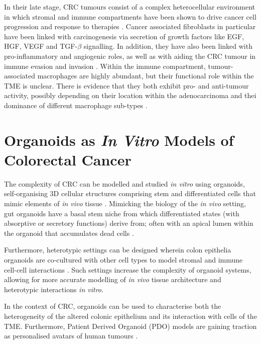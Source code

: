 In their late stage, CRC tumours consist of a complex heterocellular environment in which stromal and immune compartments have been shown to drive cancer cell progression \cite{peddareddigari_tumor_2010,isella_stromal_2015} and response to therapies \cite{tape_heterocellular_2017, toor_immune_2019}.
Cancer associated fibroblasts in particular have been linked with carcinogenesis via secretion of growth factors like EGF, HGF, VEGF and TGF-$\beta$ signalling. In addition, they have also been linked with pro-inflammatory and angiogenic roles, as well as with aiding the CRC tumour in immune evasion and invasion \cite{karagiannis_cancer-associated_2012}.
Within the immune compartment, tumour-associated macrophages are highly abundant, but their functional role within the TME is unclear. There is evidence that they both exhibit pro- and anti-tumour activity, possibly depending on their location within the adenocarcinoma and thei dominance of different macrophage sub-types \cite{martinez_m1_2014}. 

\newpage
\section{Organoids as \textit{In Vitro} Models of Colorectal Cancer}

The complexity of CRC can be modelled and studied \emph{in vitro} using organoids, self-organising 3D cellular structures comprising stem and differentiated cells that mimic elements of \emph{in vivo} tissue \cite{huch_modeling_2015,lancaster_disease_2019,almeqdadi_gut_2019}. Mimicking the biology of the \emph{in vivo} setting, gut organoids have a basal stem niche from which differentiated states (with absorptive or secretory functions) derive from; often with an apical lumen within the organoid that accumulates dead cells \cite{sato_single_2009}.

Furthermore, heterotypic settings can be designed wherein colon epithelia organoids are co-cultured with other cell types to model stromal and immune cell-cell interactions \cite{qin_cell-type-specific_2020}. Such settings increase the complexity of organoid systems, allowing for more accurate modelling of \emph{in vivo} tissue architecture and heterotypic interactions \emph{in vitro}. 

In the context of CRC, organoids can be used to characterise both the heterogeneity of the altered colonic epithelium and its interaction with cells of the TME. Furthermore, Patient Derived Organoid (PDO) models are gaining traction as personalised avatars of human tumours \cite{su_efficacy_2023,zapatero_trellis_2023}.

